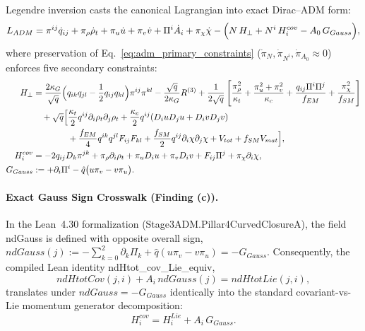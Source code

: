 \documentclass[american,11pt,letterpaper]{article}
\def\mathcal#1{#1}%
\def\mathrm#1{#1}%
\def\texttt#1{#1}%
\begin{document}
Legendre inversion casts the canonical Lagrangian into exact Dirac--ADM form:
\begin{equation}
\mathcal{L}_{\mathrm{ADM}}
= \pi^{ij}\dot{q}_{ij} + \pi_\rho\dot{\rho}_t + \pi_u\dot{u} + \pi_v\dot{v} + \Pi^i\dot{A}_i + \pi_\chi\dot{\chi}
  - \Bigl(N\,\mathcal{H}_\perp + N^i\,\mathcal{H}_i^{\mathrm{cov}} - A_0\,G_{\mathrm{Gauss}}\Bigr),
\label{eq:L_ADM_canonical}
\end{equation}
where preservation of Eq.~\eqref{eq:adm_primary_constraints} ($\dot{\pi}_N, \dot{\pi}_{N^i}, \dot{\pi}_{A_0} \approx 0$) enforces five secondary constraints:
\begin{align}
\mathcal{H}_\perp &= \frac{2\kappa_G}{\sqrt{q}}\Bigl(q_{ik}q_{jl} - \frac{1}{2}q_{ij}q_{kl}\Bigr)\pi^{ij}\pi^{kl}
  - \frac{\sqrt{q}}{2\kappa_G}R^{(3)}
  + \frac{1}{2\sqrt{q}}\left[\frac{\pi_\rho^2}{\kappa_t} + \frac{\pi_u^2 + \pi_v^2}{\kappa_c} + \frac{q_{ij}\Pi^i\Pi^j}{f_{\mathrm{EM}}} + \frac{\pi_\chi^2}{f_{\mathrm{SM}}}\right]
  \nonumber\\
&\quad + \sqrt{q}\Bigl[
    \frac{\kappa_t}{2}q^{ij}\partial_i\rho_t\partial_j\rho_t
    + \frac{\kappa_c}{2}q^{ij}(D_i u D_j u + D_i v D_j v)
    \nonumber\\
&\qquad\qquad
    + \frac{f_{\mathrm{EM}}}{4}q^{ik}q^{jl}F_{ij}F_{kl}
    + \frac{f_{\mathrm{SM}}}{2}q^{ij}\partial_i\chi\partial_j\chi
    + V_{\mathrm{tot}} + f_{\mathrm{SM}}V_{\mathrm{mat}}
  \Bigr], \label{eq:H_perp_def}\\
\mathcal{H}_i^{\mathrm{cov}} &= -2 q_{ij} D_k\pi^{jk} + \pi_\rho\partial_i\rho_t + \pi_u D_i u + \pi_v D_i v + F_{ij}\Pi^j + \pi_\chi\partial_i\chi, \label{eq:Hi_cov_def}\\
G_{\mathrm{Gauss}} &:= +\partial_i\Pi^i - \hat{q}\bigl(u\pi_v - v\pi_u\bigr). \label{eq:G_Gauss_def}
\end{align}

\paragraph{Exact Gauss Sign Crosswalk (\texttt{Finding (c)}).}
In the Lean~4.30 formalization (\texttt{Stage3\allowbreak{}ADM.\allowbreak{}Pillar4\allowbreak{}Curved\allowbreak{}Closure\allowbreak{}A}), the field \texttt{ndGauss} is defined with opposite overall sign, $\mathrm{ndGauss}(j) := -\sum_{k=0}^2 \partial_k\Pi_k + \hat{q}(u\pi_v - v\pi_u) = -G_{\mathrm{Gauss}}$. Consequently, the compiled Lean identity \texttt{nd\allowbreak{}Htot\_\allowbreak{}cov\_\allowbreak{}Lie\_\allowbreak{}equiv},
\[
\mathrm{ndHtotCov}(j, i) + A_i\,\mathrm{ndGauss}(j) = \mathrm{ndHtotLie}(j, i),
\]
translates under $\mathrm{ndGauss} = -G_{\mathrm{Gauss}}$ identically into the standard covariant-vs-Lie momentum generator decomposition:
\begin{equation}
\mathcal{H}_i^{\mathrm{cov}} = \mathcal{H}_i^{\mathrm{Lie}} + A_i\,G_{\mathrm{Gauss}}.
\label{eq:Hi_cov_Lie_identity}
\end{equation}
\end{document}
